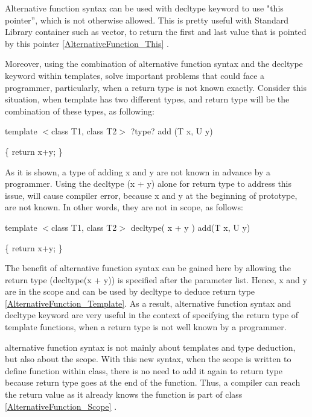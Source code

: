 \documentclass[11pt]{report}
\begin{document}
Alternative function syntax can be used with decltype keyword to use "this pointer”, which is not otherwise allowed. This is pretty useful with Standard Library container such as vector, to return the first and last value that is pointed by this pointer \ref{AlternativeFunction_This} \cite{ISO:2011:Cpplanguage}. 


Moreover, using the combination of alternative function syntax and the decltype keyword within templates, solve important problems that could face a programmer, particularly, when a return type is not known exactly.  Consider this situation, when template has two different types, and return type will be the combination of these types, as following:
\begin{center}
template $<$class T1, class T2$>$  ?type? add (T x, U y) 


\{ return x+y; \}
\end{center}

As it is shown, a type of adding x and y are not known in advance by a programmer. Using the decltype (x + y) alone for return type to address this issue, will cause compiler error, because x and y at the beginning of prototype, are not known.  In other words, they are not in scope, as follows:

\begin{center}
template $<$class T1, class T2$>$  decltype( x + y ) add(T x, U y)


\{ return x+y; \}
\end{center}

The benefit of alternative function syntax can be gained here by allowing the return type (decltype(x + y)) is specified after the parameter list. Hence, x and y are in the scope and can be used by decltype to deduce return type \ref{AlternativeFunction_Template}. As a result, alternative function syntax and decltype keyword are very useful in the context of specifying the return type of template functions, when a return type is not well known by a programmer\cite{Prata:2012:Cpp}.


alternative function syntax is not mainly about templates and type deduction, but also about the scope.  With this new syntax, when the scope is written to define function within class, there is no need to add it again to return type because return type goes at the end of the function. Thus, a compiler can reach the return value as it already knows the function is part of class \ref{AlternativeFunction_Scope} \cite{Allain:2011:FutureCpp}.
\end{document}
